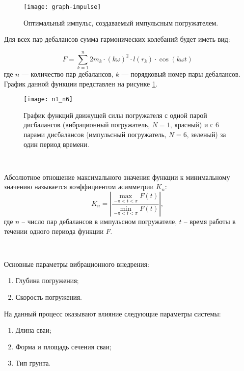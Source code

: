 \begin{figure}[ht]
    \centering
    \texttt{[image: graph-impulse]}
    \caption{Оптимальный импульс, создаваемый импульсным погружателем.}
    \label{fig:graph-impulse}
\end{figure}

\noindent Для всех пар дебалансов сумма гармонических колебаний будет иметь вид:

\begin{equation}
    \label{eq:F}
    F = \sum\limits_{k = 1}^n 2 m_k \cdot (k \omega)^2 \cdot l(r_k) \cdot \cos (k \omega t)
\end{equation}
\noindent где $n$ --- количество пар дебалансов, $k$ --- порядковый номер пары дебалансов. График данной функции
представлен на рисунке \ref{fig:graph-impulse}.

\begin{figure}[ht]
    \centering
    \texttt{[image: n1\_n6]}
    \caption{График функций движущей силы погружателя с одной парой дисбалансов (вибрационный погружатель, $N = 1$, красный) и с 6 парами дисбалансов (импульсный погружатель, $N = 6$, зеленый) за один период времени.}
    \label{fig:n1_n6}
\end{figure}

~\

Абсолютное отношение максимального значения функции к минимальному значению называется коэффициентом асимметрии $K_n$:
\begin{equation}
    \label{eq:asymm-coef}
    K_n = \left| \frac{ \max\limits_{-\pi<t<\pi} F(t)}{\min\limits_{-\pi<t<\pi} F(t)}\right|,
\end{equation}
где $n$ -- число пар дебалансов в импульсном погружателе, $t$ -- время работы в течении одного периода функции $F$.

~\

\noindent Основные параметры вибрационного внедрения:
\begin{enumerate}
    \item Глубина погружения;
    \item Скорость погружения.
\end{enumerate}
На данный процесс оказывают влияние следующие параметры системы:
\begin{enumerate}
    \item Длина сваи;
    \item Форма и площадь сечения сваи;
    \item Тип грунта.
\end{enumerate}

